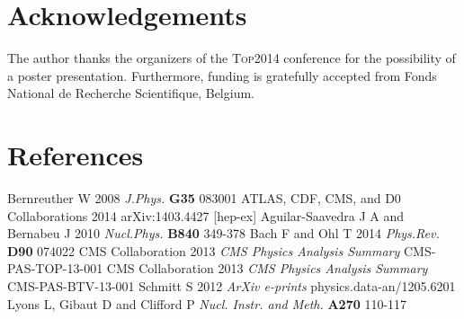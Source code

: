 \documentclass[a4paper]{jpconf}
\begin{document}
\section{Acknowledgements}
The author thanks the organizers of the \textsc{Top2014} conference for the possibility of a poster presentation. Furthermore, funding is gratefully accepted from Fonds National de Recherche Scientifique, Belgium.


\section*{References}
\begin{thebibliography}{7}
 Bernreuther W 2008 {\it J.Phys.} {\bf G35} 083001 
 ATLAS, CDF, CMS, and D0 Collaborations 2014 arXiv:1403.4427 [hep-ex]
 Aguilar-Saavedra J A and Bernabeu J 2010 {\it Nucl.Phys.} {\bf B840} 349-378 
 Bach F and Ohl T 2014 {\it Phys.Rev.} {\bf D90} 074022 
 CMS Collaboration 2013 {\it CMS Physics Analysis Summary} CMS-PAS-TOP-13-001
 CMS Collaboration 2013 {\it CMS Physics Analysis Summary} CMS-PAS-BTV-13-001
 Schmitt S 2012 {\it ArXiv e-prints} physics.data-an/1205.6201
 Lyons L, Gibaut D and Clifford P {\it Nucl. Instr. and Meth.} {\bf A270} 110-117
\end{thebibliography}
\end{document}
